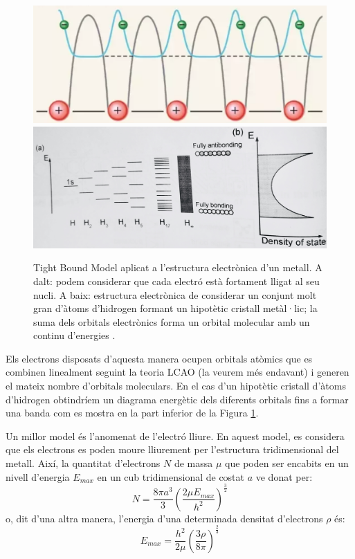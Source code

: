 \begin{figure}[h]
\centering
\includegraphics[scale=0.5]{figures/TightBoundModel1.png}
\includegraphics[scale=0.13]{figures/TightBoundModel2.png}
\caption[Tight Bound Model]{Tight Bound Model aplicat a l'estructura electrònica d'un metall. A dalt: podem considerar que cada electró està fortament lligat al seu nucli. A baix: estructura electrònica de considerar un conjunt molt gran d'àtoms d'hidrogen formant un hipotètic cristall metàl·lic; la suma dels orbitals electrònics forma un orbital molecular  amb un continu d'energies \cite{yen_chemistry_2008}.}
\label{fig:TightBoundModel}
\end{figure}

Els electrons disposats d'aquesta manera ocupen orbitals atòmics que es combinen linealment seguint la teoria LCAO (la veurem més endavant) i generen el mateix nombre d'orbitals moleculars. En el cas d'un hipotètic cristall d'àtoms d'hidrogen obtindríem un diagrama energètic dels diferents orbitals fins a formar una banda com es mostra en la part inferior de la Figura \ref{fig:TightBoundModel}.

Un millor model és l'anomenat de l'electró lliure. 
En aquest model, es considera que els electrons es poden moure lliurement per l'estructura tridimensional del metall. 
Així, la quantitat d'electrons $N$ de massa $\mu$ que poden ser encabits en un nivell d'energia $E_{max}$ en un cub tridimensional de costat $a$ ve donat per:
\[
N=\frac{8 \pi a^3}{3} \left( \frac{2 \mu E_{max}}{h^2} \right)^{\frac{3}{2}}
\]
o, dit d'una altra manera, l'energia d'una determinada densitat d'electrons $\rho$ és:
\[E_{max} = \frac{h^2}{2 \mu} \left( \frac{3 \rho}{8 \pi} \right)^{\frac{2}{3}}\]

